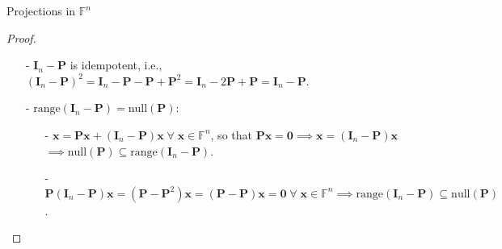 \documentclass[t,usepdftitle=false]{beamer}
\begin{document}
\begin{frame}{Projections in $\mathbb{F}^n$}
\begin{itemize}
\begin{proof}
\begin{itemize}
\item[-] $\mathbf{I}_n-\mathbf{P}$ is idempotent, i.e., $(\mathbf{I}_n\!-\mathbf{P})^2=\mathbf{I}_n\!-\mathbf{P}-\mathbf{P}+\mathbf{P}^2=\mathbf{I}_n\!-2\mathbf{P}+\mathbf{P}=\mathbf{I}_n\!-\mathbf{P}$.\vspace{-.1cm}
\item[-] $\mathrm{range}(\mathbf{I}_n-\mathbf{P})=\mathrm{null}(\mathbf{P})$:
\begin{itemize}
\item[-] $\mathbf{x}=\mathbf{P}\mathbf{x}+(\mathbf{I}_n-\mathbf{P})\mathbf{x}\;\forall\;\mathbf{x}\in\mathbb{F}^n$, so that $\mathbf{P}\mathbf{x}=\boldsymbol{0}\implies \mathbf{x}=(\mathbf{I}_n-\mathbf{P})\mathbf{x}$\\
\hspace{6.65cm}$\implies\mathrm{null}(\mathbf{P})\subseteq\mathrm{range}(\mathbf{I}_n-\mathbf{P})$.\vspace{.1cm}
\item[-] $\mathbf{P}(\mathbf{I}_n-\mathbf{P})\mathbf{x}=(\mathbf{P}-\mathbf{P}^2)\mathbf{x}
=(\mathbf{P}-\mathbf{P})\mathbf{x}=\boldsymbol{0}\;\forall\;\mathbf{x}\in\mathbb{F}^n\implies\mathrm{range}(\mathbf{I}_n-\mathbf{P})\subseteq \mathrm{null}(\mathbf{P})$.\vspace{-.25cm}
\end{itemize}
\end{itemize}
\end{proof}
\end{itemize}
\end{frame}
\end{document}
